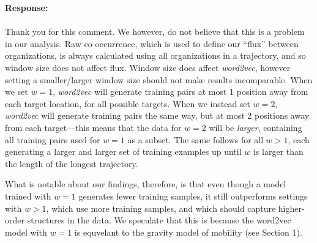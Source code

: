 \documentclass[12pt,a4paper]{article}
\newcounter{comment}[subsection]
\newcommand{\response}[1]{{\noindent \textbf{Response:} \\ \\ \noindent #1}}
\begin{document}
\response{
	Thank you for this comment.
	We however, do not believe that this is a problem in our analysis.
	Raw co-occurrence, which is used to define our ``flux'' between organizations, is always calculated using all organizations in a trajectory, and so window size does not affect flux.
	Window size does affect \textit{word2vec}, however setting a smaller/larger window size should not make results incomparable.
	When we set $w = 1$, \textit{word2vec} will generate training pairs at most 1 position away from each target location, for all possible targets.
	When we instead set $w = 2$, \textit{word2vec} will generate training pairs the same way, but at most 2 positions away from each target---this means that the data for $w = 2$ will be \textit{larger}, containing all training pairs used for $w = 1$ as a subset.
	The same follows for all $w > 1$, each generating a larger and larger set of training examples up until $w$ is larger than the length of the longest trajectory.

	What is notable about our findings, therefore, is that even though a model trained with $w = 1$ generates fewer training samples, it still outperforms settings with $w > 1$, which use more training samples, and which should capture higher-order structures in the data.
	We speculate that this is because the word2vec model with $w = 1$ is equvelant to the gravity model of mobility (see Section 1).
}
\end{document}
